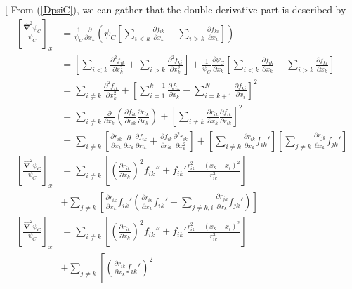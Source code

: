 \documentclass[twocolumns, a4paper,11pt,fleqn]{extarticle}
\newcommand{\eq}[1]{{\small\begin{align*}#1\end{align*}}}
\newcommand{\op}[1]{\hat{#1}}
\begin{document}
\twocolumn[{%
From (\ref{DpsiC}), we can gather that the double derivative part is described by
\eq{
  \left[\frac{\mathbf{\op\nabla}^2 \psi_C}{\psi_C}\right]_x
  &=\frac{1}{\psi_C}\frac{\partial}{\partial x_k}\left(\psi_C
      \left[\sum_{i<k} \frac{\partial f_{ik}}{\partial x_k}
      +\sum_{i>k} \frac{\partial f_{ki}}{\partial x_k} \right]\right)\\
  &=\left[\sum_{i<k} \frac{\partial^2 f_{ik}}{\partial x_k^2}
      +\sum_{i>k} \frac{\partial^2 f_{ki}}{\partial x_k^2} \right]
      +\frac{1}{\psi_C}\frac{\partial \psi_C}{\partial x_k}
      \left[\sum_{i<k} \frac{\partial f_{ik}}{\partial x_k}
      +\sum_{i>k} \frac{\partial f_{ki}}{\partial x_k} \right]\\
  &=\sum_{i\neq k}\frac{\partial^2 f_{ik}}{\partial x_k^2} +
    \left[\sum_{i=1}^{k-1}\frac{\partial f_{ik}}{\partial x_k} -
    \sum_{i=k+1}^{N}\frac{\partial f_{ki}}{\partial x_i}
    \right]^2\\
  &=\sum_{i\neq k}
    \frac{\partial}{\partial x_k}
    \left(
    \frac{\partial f_{ik}}{\partial r_{ik}}
    \frac{\partial r_{ik}}{\partial x_k}
    \right)+
    \left[\sum_{i\neq k}\frac{\partial r_{ik}}{\partial x_k}
    \frac{\partial f_{ik}}{\partial r_{ik}}
    \right]^2\\
  &=\sum_{i\neq k}
    \left[
    \frac{\partial r_{ik}}{\partial x_k}
    \frac{\partial}{\partial x_k}
    \frac{\partial f_{ik}}{\partial r_{ik}}
    +
    \frac{\partial f_{ik}}{\partial r_{ik}}
    \frac{\partial^2 r_{ik}}{\partial x_k^2}\right]
    +
    \left[\sum_{i\neq k}\frac{\partial r_{ik}}{\partial x_k} f_{ik}'
    \right]
    \left[\sum_{j\neq k}\frac{\partial r_{jk}}{\partial x_k} f_{jk}'
    \right]\\
  \left[\frac{\mathbf{\op\nabla}^2 \psi_C}{\psi_C}\right]_x
  &=\sum_{i\neq k}
    \left[
    \left(
    \frac{\partial r_{ik}}{\partial x_k}
    \right)^2
    f_{ik}''
    +
    f_{ik}'
    \frac{r_{ik}^2 - (x_k-x_i)^2}{r_{ik}^3}\right]
    \\&+
    \sum_{j\neq k}\left[\frac{\partial r_{ik}}{\partial x_k} f_{ik}'\left(
    \frac{\partial r_{ik}}{\partial x_k} f_{ik}'+
    \sum_{j\neq k,i} \frac{\partial r_{jk}}{\partial x_k} f_{jk}'\right)
    \right]\\
  \left[\frac{\mathbf{\op\nabla}^2 \psi_C}{\psi_C}\right]_x
  &=\sum_{i\neq k}
    \left[
    \left(
    \frac{\partial r_{ik}}{\partial x_k}
    \right)^2
    f_{ik}''
    +
    f_{ik}'
    \frac{r_{ik}^2 - (x_k-x_i)^2}{r_{ik}^3}\right]
    \\&+
    \sum_{j\neq k}\left[\left(\frac{\partial r_{ik}}{\partial x_k} f_{ik}'\right)^2
}}
\end{document}
